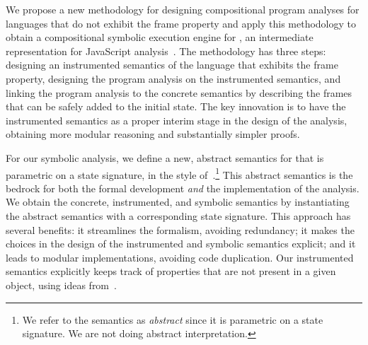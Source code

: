 
We propose a new methodology for designing compositional program analyses for languages that do not exhibit the frame property and apply this methodology to obtain a compositional symbolic execution engine for \jsil, an intermediate representation for JavaScript analysis~\cite{javert}. 
%
%
The methodology has three steps:  designing an instrumented semantics of the language that exhibits the frame property,  designing the program  analysis on the instrumented semantics, and  linking the program analysis to the concrete semantics by describing the frames that can be safely added to the initial state.   
%
The key innovation is to have the instrumented semantics as a proper interim stage in the design of the analysis, obtaining 
more modular reasoning and substantially simpler proofs.

For our symbolic analysis, we define a new, abstract semantics for \jsil that is parametric on a \jsil state signature, in the style of~\citet{vanhorn:icfp:2010}.\footnote{We refer to the semantics as \emph{abstract} since it 
is parametric on a \jsil state signature. We are not doing abstract interpretation.} 
This abstract semantics is the bedrock for both the formal development \emph{and} the implementation of the analysis. 
We obtain the concrete, instrumented, and symbolic semantics by instantiating 
the abstract semantics with a corresponding state signature. 
This approach has several benefits: it streamlines the formalism, avoiding redundancy; it makes the choices in the design of the instrumented and symbolic semantics explicit; and it leads to modular implementations, avoiding code duplication.
%
Our instrumented semantics explicitly keeps track of properties that are not present in a given object, using ideas from~\cite{gardner:popl:2012,javert}.




